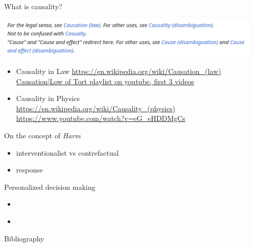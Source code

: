 \documentclass{beamer}
\begin{document}
\begin{frame}{What is causality?}
  \begin{center}
    \includegraphics[width=0.95\textwidth]{Causality-Wikipedia}
  \end{center}
  \begin{itemize}
    \item Causality in Law  \url{https://en.wikipedia.org/wiki/Causation_(law)}
      \href{https://www.youtube.com/watch?v=XiCOmhdkM80&list=PLqMxKp2ot-3vDaLyaAZNgt8ijj6n0l460}{Causation|Low of Tort playlist on youtube, first 3 videos}  
    \item Causality in Physics \\
       \url{https://en.wikipedia.org/wiki/Causality_(physics)}  \\
       \url{https://www.youtube.com/watch?v=eG_eHDDMgCs} \\
       \cite{rovelli2022causationrootedthermodynamics}  
  \end{itemize}
\end{frame}
 
\begin{frame}{On the concept of \emph{Harm}} 
  \begin{itemize}
    \item \cite{sarvet2023perspective}  interventionalist vs contrefactual  
    \item \cite{mueller2024perspective} response 
  \end{itemize}
\end{frame}


\begin{frame}{Personalized decision making}
  \begin{itemize}
    \item \cite{mueller2023personalized} 
    \item \cite{tian2000probabilities} 
  \end{itemize}
\end{frame}


\begin{frame}[allowframebreaks]{Bibliography}

\end{frame}
\end{document}
